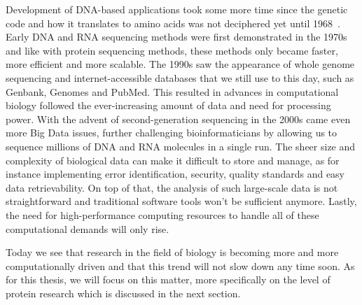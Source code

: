 Development of DNA-based applications took some more time since the genetic code and how it translates to amino acids was not deciphered yet until 1968~\cite{codon}. Early DNA and RNA sequencing methods were first demonstrated in the 1970s~\cite{dnaseq, rna} and like with protein sequencing methods, these methods only became faster, more efficient and more scalable. The 1990s saw the appearance of whole genome sequencing and internet-accessible databases that we still use to this day, such as Genbank, Genomes and PubMed. This resulted in advances in computational biology followed the ever-increasing amount of data and need for processing power. With the advent of second-generation sequencing in the 2000s came even more Big Data issues, further challenging bioinformaticians by allowing us to sequence millions of DNA and RNA molecules in a single run. The sheer size and complexity of biological data can make it difficult to store and manage, as for instance implementing error identification, security, quality standards and easy data retrievability. On top of that, the analysis of such large-scale data is not straightforward and traditional software tools won't be sufficient anymore. Lastly, the need for high-performance computing resources to handle all of these computational demands will only rise.

Today we see that research in the field of biology is becoming more and more computationally driven and that this trend will not slow down any time soon. As for this thesis, we will focus on this matter, more specifically on the level of protein research which is discussed in the next section.